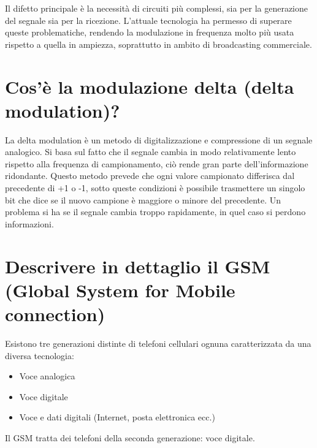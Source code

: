 Il difetto principale è la necessità di circuiti più complessi, sia per la generazione del segnale sia per la ricezione. L’attuale tecnologia ha permesso di superare queste problematiche, rendendo la modulazione in frequenza molto più usata rispetto a quella in ampiezza, soprattutto in ambito di broadcasting commerciale.

\section{Cos’è la modulazione delta (delta modulation)?}
La delta modulation è un metodo di digitalizzazione e compressione di un segnale analogico.
Si basa sul fatto che il segnale cambia in modo relativamente lento rispetto alla frequenza di campionamento, ciò rende gran parte dell’informazione ridondante.
Questo metodo prevede che ogni valore campionato differisca dal precedente di +1 o -1, sotto queste condizioni è possibile trasmettere un singolo bit che dice se il nuovo campione è maggiore o minore del precedente.
Un problema si ha se il segnale cambia troppo rapidamente, in quel caso si perdono informazioni.
 
\section{Descrivere in dettaglio il GSM (Global System for Mobile connection)}
Esistono tre generazioni distinte di telefoni cellulari ognuna caratterizzata da una diversa tecnologia:
\begin{itemize}
\item	Voce analogica
\item	Voce digitale
\item	Voce e dati digitali (Internet, posta elettronica ecc.)
\end{itemize}
Il GSM tratta dei telefoni della seconda generazione: voce digitale.

